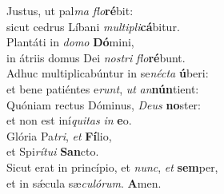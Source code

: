 \evenverse Justus, ut pal\textit{ma} \textit{flo}\textbf{ré}bit:~\*\\
\evenverse sicut cedrus Líbani \textit{mul}\textit{ti}\textit{pli}\textbf{cá}bitur.\\
\oddverse Plantáti in \textit{do}\textit{mo} \textbf{Dó}mini,~\*\\
\oddverse in átriis domus Dei \textit{no}\textit{stri} \textit{flo}\textbf{ré}bunt.\\
\evenverse Adhuc multiplicabúntur in se\textit{né}\textit{cta} \textbf{ú}beri:~\*\\
\evenverse et bene patiéntes e\textit{runt}, \textit{ut} \textit{an}\textbf{nún}tient:\\
\oddverse Quóniam rectus Dóminus, \textit{De}\textit{us} \textbf{no}ster:~\*\\
\oddverse et non est iní\textit{qui}\textit{tas} \textit{in} \textbf{e}o.\\
\evenverse Glória Pa\textit{tri}, \textit{et} \textbf{Fí}lio,~\*\\
\evenverse et Spi\textit{rí}\textit{tu}\textit{i} \textbf{San}cto.\\
\oddverse Sicut erat in princípio, et \textit{nunc}, \textit{et} \textbf{sem}per,~\*\\
\oddverse et in sǽcula sæ\textit{cu}\textit{ló}\textit{rum}. \textbf{A}men.\\
